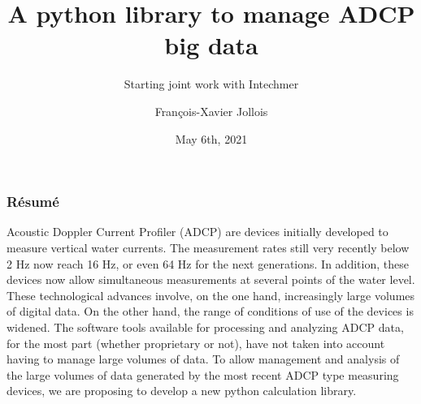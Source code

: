 \documentclass[11pt]{beamer}
\begin{document}
	\author{François-Xavier Jollois}
	\title{A python library to manage ADCP big data}
	\subtitle{Starting joint work with Intechmer}
	\date{May 6th, 2021}
	\begin{frame}[plain]
		\maketitle
	\end{frame}
	
	\begin{frame}
		\frametitle{Résumé}
		
		
		Acoustic Doppler Current Profiler (ADCP) are devices initially developed to measure vertical water currents. The measurement rates still very recently below 2 Hz now reach 16 Hz, or even 64 Hz for the next generations. In addition, these devices now allow simultaneous measurements at several points of the water level. These technological advances involve, on the one hand, increasingly large volumes of digital data. On the other hand, the range of conditions of use of the devices is widened. The software tools available for processing and analyzing ADCP data, for the most part (whether proprietary or not), have not taken into account having to manage large volumes of data. To allow management and analysis of the large volumes of data generated by the most recent ADCP type measuring devices, we are proposing to develop a new python calculation library.
		
	\end{frame}
\end{document}
